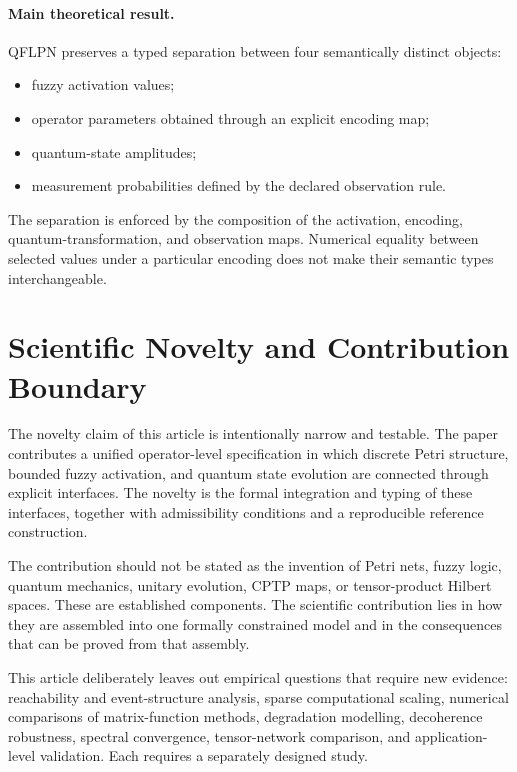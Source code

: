 \documentclass[final,3p,times]{elsarticle}
\begin{document}
\paragraph{Main theoretical result.}
QFLPN preserves a typed separation between four semantically distinct objects:
\begin{itemize}
  \item fuzzy activation values;
  \item operator parameters obtained through an explicit encoding map;
  \item quantum-state amplitudes;
  \item measurement probabilities defined by the declared observation rule.
\end{itemize}
The separation is enforced by the composition of the activation, encoding, quantum-transformation, and observation maps. Numerical equality between selected values under a particular encoding does not make their semantic types interchangeable.


\section{Scientific Novelty and Contribution Boundary}

The novelty claim of this article is intentionally narrow and testable. The paper contributes a unified operator-level specification in which discrete Petri structure, bounded fuzzy activation, and quantum state evolution are connected through explicit interfaces. The novelty is the formal integration and typing of these interfaces, together with admissibility conditions and a reproducible reference construction.

The contribution should not be stated as the invention of Petri nets, fuzzy logic, quantum mechanics, unitary evolution, CPTP maps, or tensor-product Hilbert spaces. These are established components. The scientific contribution lies in how they are assembled into one formally constrained model and in the consequences that can be proved from that assembly.

This article deliberately leaves out empirical questions that require new evidence: reachability and event-structure analysis, sparse computational scaling, numerical comparisons of matrix-function methods, degradation modelling, decoherence robustness, spectral convergence, tensor-network comparison, and application-level validation. Each requires a separately designed study.
\end{document}
